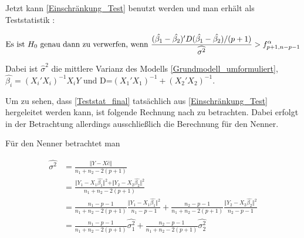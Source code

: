 \documentclass[12pt,a4paper]{article}
\theoremstyle{definition}
\theoremstyle{definition}
\theoremstyle{definition}
\theoremstyle{definition}
\begin{document}
Jetzt kann \eqref{Einschränkung_Test} benutzt werden und man erhält als Teststatistik : 

\begin{equation}
\textnormal{Es ist } H_0 \textnormal{ genau dann zu verwerfen, wenn } 
\frac{(\hat{\beta_1}-\hat{\beta_2})'D (\hat{\beta_1}-\hat{\beta_2})/(p+1)}{\widehat{\sigma^2}} > f^{\alpha}_{p+1,n-p-1}\label{Teststat_final}
\end{equation}

Dabei ist $\hat{\sigma}^2$ die mittlere Varianz des Modells \eqref{Grundmodell_umformuliert}, $\hat{\beta_i} = (X_i'X_i)^{-1}X_iY$ und \gls{D}=$(X_1'X_1)^{-1}+(X_2'X_2)^{-1}$. 

Um zu sehen, dass \eqref{Teststat_final} tatsächlich aus \eqref{Einschränkung_Test} hergeleitet werden kann, ist folgende Rechnung nach \cite[115]{Liu64} zu betrachten. Dabei erfolgt in der Betrachtung allerdings ausschließlich die Berechnung für den Nenner.

%
%
%

Für den Nenner betrachtet man

\begin{align*}
\widehat{\sigma^2}  &= \frac{\Vert Y-X \hat{c} \Vert}{n_1 + n_2 - 2(p+1)} \\
				&= \frac{\Vert Y_1 - X_1 \hat{\beta_1} \Vert^2 + \Vert Y_2 - X_2 \hat{\beta_2} \Vert^2}{n_1+n_2-2(p+1)} \\
				&= \frac{n_1-p-1}{n_1+n_2-2(p+1)} \frac{\Vert Y_1 - X_1 \hat{\beta_1} \Vert^2}{n_1-p-1}+ \frac{n_2-p-1}{n_1+n_2-2(p+1)} \frac{\Vert Y_2 - X_2 \hat{\beta_2} \Vert^2}{n_2-p-1} \\
				&= \frac{n_1-p-1}{n_1+n_2-2(p+1)} \hat{\sigma_{1}^2}+ \frac{n_2-p-1}{n_1+n_2-2(p+1)} \hat{\sigma_{2}^2}
\end{align*}
\end{document}
